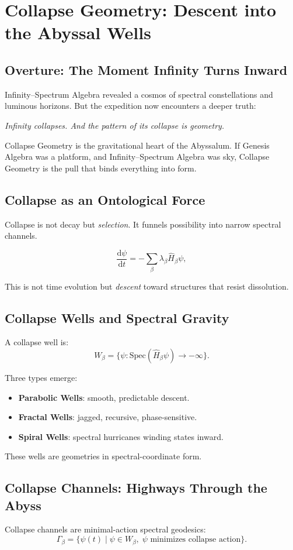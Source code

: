 
\chapter{Collapse Geometry: Descent into the Abyssal Wells}
\label{ch:collapse-geometry}

\section*{Overture: The Moment Infinity Turns Inward}
Infinity--Spectrum Algebra revealed a cosmos of spectral constellations and luminous horizons.
But the expedition now encounters a deeper truth:

\emph{Infinity collapses. And the pattern of its collapse is geometry.}

Collapse Geometry is the gravitational heart of the Abyssalum.
If Genesis Algebra was a platform, and Infinity--Spectrum Algebra was sky,
Collapse Geometry is the pull that binds everything into form.

\section{Collapse as an Ontological Force}
Collapse is not decay but \emph{selection}. It funnels possibility into narrow spectral channels.

\[
\frac{\mathrm{d}\psi}{\mathrm{d}t}
=
-\sum_{\beta}
\lambda_\beta \hat{H}_\beta \psi,
\]

This is not time evolution but \emph{descent} toward structures that resist dissolution.

\section{Collapse Wells and Spectral Gravity}
A collapse well is:
\[
W_\beta =
\{\psi : \mathrm{Spec}(\hat{H}_\beta \psi) \to -\infty\}.
\]

Three types emerge:
\begin{itemize}
  \item \textbf{Parabolic Wells}: smooth, predictable descent.
  \item \textbf{Fractal Wells}: jagged, recursive, phase-sensitive.
  \item \textbf{Spiral Wells}: spectral hurricanes winding states inward.
\end{itemize}

These wells are geometries in spectral-coordinate form.

\section{Collapse Channels: Highways Through the Abyss}
Collapse channels are minimal-action spectral geodesics:
\[
\Gamma_\beta = \{\psi(t)\;|\;\psi \in W_\beta,\; \psi \text{ minimizes collapse action}\}.
\]

